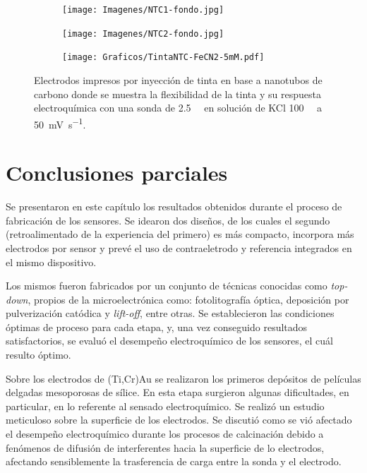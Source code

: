 { 	  	%
 	  			\begin{figure}[th]
		 	   	    \begin{subfigure}[t]{0.25\textwidth}
			       	\texttt{[image: Imagenes/NTC1-fondo.jpg]}
			   		\end{subfigure}
			   		\begin{subfigure}[t]{0.25\textwidth}
			       	\texttt{[image: Imagenes/NTC2-fondo.jpg]}
			   		\end{subfigure}
			   		\begin{subfigure}[t]{0.43\textwidth}
			   	    \texttt{[image: Graficos/TintaNTC-FeCN2-5mM.pdf]}
			   		\end{subfigure}
					 \caption[Electrodos de NTC flexibles.]{Electrodos impresos por inyección de tinta en base a nanotubos de carbono donde se muestra la flexibilidad de la tinta y su respuesta electroquímica con una sonda de \fe\space \SI{2.5}{\milli\Molar} en solución de KCl \SI{100}{\milli\Molar} a \SI{50}{\milli\volt\per\second}.}
					 \label{fig:tintas}	
				     \end{figure}
 
\section{Conclusiones parciales}

	Se presentaron en este capítulo los resultados obtenidos durante el proceso de fabricación de los sensores. Se idearon dos diseños, de los cuales el segundo (retroalimentado de la experiencia del primero) es más compacto, incorpora más electrodos por sensor y prevé el uso de contraeletrodo y referencia integrados en el mismo dispositivo.
	
	Los mismos fueron fabricados por un conjunto de técnicas conocidas como \textit{top-down}, propios de la microelectrónica como: fotolitografía óptica, deposición por pulverización catódica y \textit{lift-off}, entre otras. Se establecieron las condiciones óptimas de proceso para cada etapa, y, una vez conseguido resultados satisfactorios, se evaluó el desempeño electroquímico de los sensores, el cuál resulto óptimo. 

	Sobre los electrodos de (Ti,Cr)\textbar Au se realizaron los primeros depósitos de películas delgadas mesoporosas de sílice. En esta etapa surgieron algunas dificultades, en particular, en lo referente al sensado electroquímico. Se realizó un estudio meticuloso sobre la superficie de los electrodos.  Se discutió como se vió afectado el desempeño electroquímico durante los procesos de calcinación debido a fenómenos de difusión de interferentes hacia la superficie de lo electrodos, afectando sensiblemente la trasferencia de carga entre la sonda y el electrodo. 

}
